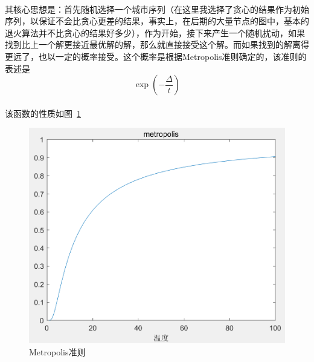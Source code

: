 \documentclass[UTF8,a4paper]{ctexart}
\begin{document}
\paragraph{}其核心思想是：首先随机选择一个城市序列（在这里我选择了贪心的结果作为初始序列，以保证不会比贪心更差的结果，事实上，在后期的大量节点的图中，基本的退火算法并不比贪心的结果好多少），作为开始，接下来产生一个随机扰动，如果找到比上一个解更接近最优解的解，那么就直接接受这个解。而如果找到的解离得更远了，也以一定的概率接受。这个概率是根据Metropolis准则确定的，该准则的表述是
\[
    \exp\left(-\frac{\Delta}{t}\right)
\]
\paragraph{}该函数的性质如图~\ref{fig:metropolis}
\begin{figure}[htbp]
    \centering
    \includegraphics[scale=0.8]{metropolis.png}
    \caption{Metropolis准则}
    \label{fig:metropolis}
\end{figure}
\end{document}

